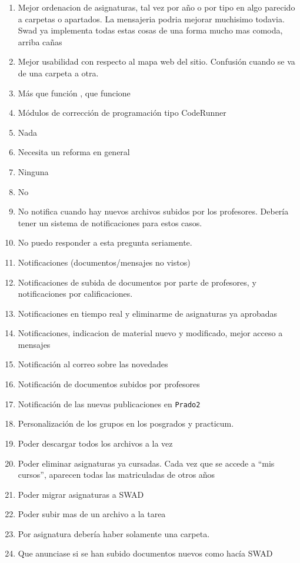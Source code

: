 \begin{enumerate}
\item Mejor ordenacion de asignaturas, tal vez por año o por tipo en algo parecido a carpetas o apartados. La mensajeria podria mejorar muchisimo todavia. Swad ya implementa todas estas cosas de una forma mucho mas comoda, arriba cañas
\item Mejor usabilidad con respecto al mapa web del sitio. Confusión cuando se va de una carpeta a otra.
\item Más que función , que funcione
\item Módulos de corrección de programación tipo CodeRunner
\item Nada
\item Necesita un reforma en general
\item Ninguna
\item No
\item No notifica cuando hay nuevos archivos subidos por los profesores. Debería tener un sistema de notificaciones para estos casos.
\item No puedo responder a esta pregunta seriamente.
\item Notificaciones (documentos/mensajes no vistos)
\item Notificaciones de subida de documentos por parte de profesores, y notificaciones por calificaciones.
\item Notificaciones en tiempo real y eliminarme de asignaturas ya aprobadas
\item Notificaciones, indicacion de material nuevo y modificado, mejor acceso a mensajes
\item Notificación al correo sobre las novedades
\item Notificación de documentos subidos por profesores
\item Notificación de las nuevas publicaciones en \texttt{Prado2}
\item Personalización de los grupos en los posgrados y practicum.
\item Poder descargar todos los archivos a la vez
\item Poder eliminar asignaturas ya cursadas. Cada vez que se accede a ``mis cursos'', aparecen todas las matriculadas de otros años
\item Poder migrar asignaturas a SWAD
\item Poder subir mas de un archivo a la tarea
\item Por asignatura debería haber solamente una carpeta.
\item Que anunciase si se han subido documentos nuevos como hacía SWAD

\end{enumerate}
